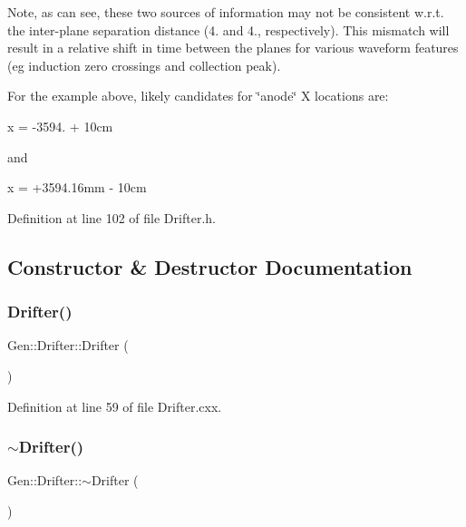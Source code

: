 Note, as can see, these two sources of information may not be consistent w.\+r.\+t. the inter-\/plane separation distance (4.\+71mm and 4.\+76mm, respectively). This mismatch will result in a relative shift in time between the planes for various waveform features (eg induction zero crossings and collection peak).

For the example above, likely candidates for \char`\"{}anode\char`\"{} X locations are\+:

x = -\/3594.\+16mm + 10cm

and

x = +3594.16mm -\/ 10cm 

Definition at line 102 of file Drifter.\+h.



\subsection{Constructor \& Destructor Documentation}
\mbox{\label{class_wire_cell_1_1_gen_1_1_drifter_a26733fe40e2ed9bb562833312b466cc0}} 
\subsubsection{\texorpdfstring{Drifter()}{Drifter()}}
{\footnotesize\ttfamily Gen\+::\+Drifter\+::\+Drifter (\begin{DoxyParamCaption}{ }\end{DoxyParamCaption})}



Definition at line 59 of file Drifter.\+cxx.

\mbox{\label{class_wire_cell_1_1_gen_1_1_drifter_a8477d8f958696ba241c94708a8393cdf}} 
\subsubsection{\texorpdfstring{$\sim$\+Drifter()}{~Drifter()}}
{\footnotesize\ttfamily Gen\+::\+Drifter\+::$\sim$\+Drifter (\begin{DoxyParamCaption}{ }\end{DoxyParamCaption})\hspace{0.3cm}{\ttfamily [virtual]}}



